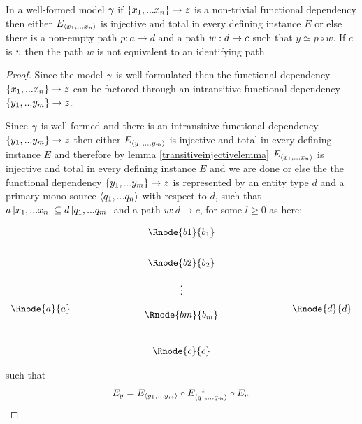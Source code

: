 \begin{lemma}
\label{mainlemma}
In a well-formed model $\gamma$ if $\{x_1,...x_n\} \rightarrow z$  is a non-trivial
functional dependency then either $E_{\langle x_1,...x_n\rangle}$ is injective and total in every defining instance $E$ 
or else there is a non-empty path $p:a \rightarrow d$
and a  path $w:d \rightarrow c$  such that $y \simeq p \circ w$. If $c$ is $v$ then
the path $w$ is not equivalent to an identifying path.
\end{lemma}
\begin{proof}
Since the model $\gamma$ is well-formulated then the functional dependency $\left\{x_1,...x_n\right\} \rightarrow z$ can be factored through an intransitive functional
dependency $\left\{y_1,...y_m\right\} \rightarrow z$. 

Since $\gamma$ is well formed  and there is an intransitive functional dependency $\left\{y_1,...y_m\right\} \rightarrow z$ then either $E_{\langle y_1,...y_m\rangle}$ is injective and total in every defining instance $E$ and therefore by lemma \ref{transitiveinjectivelemma} $E_{\langle x_1,...x_n\rangle}$ is injective and total in every defining instance $E$ and we are done or else the the functional dependency
$\left\{y_1,...y_m\right\} \rightarrow z$   is represented 
by  an entity type $d$ and 
a primary mono-source $\langle q_1,...q_n\rangle$ with respect to
$d$, such that $a\left[x_1,...x_n\right]\subseteq d\left[q_1,...q_m\right]$ and a 
path $w:d\rightarrow c$, for some $l \geq 0$ as here:

\setlength{\arraycolsep}{.2cm}
\begin{center}
$
\begin{array}{cp{2cm}c p{2cm} c}
             &  & \Rnode{b1}{b_1} & &               \\ [0.7cm]
						 &  & \Rnode{b2}{b_2} & &               \\ [0.4cm]
						 &  &     \vdots      & &               \\ [0.2cm]
\Rnode{a}{a} &  &                 & & \Rnode{d}{d}  \\ [-0.2cm]
             &  & \Rnode{bm}{b_m} & &               \\ [0.9cm]
             &  & \Rnode{c}{c}    & &               \\
\end{array}
$
\end{center}
such that
\begin{equation}
\label{fundependency}
E_y = E_{\langle y_1,...y_m\rangle} \circ E_{\langle q_1,...q_m\rangle}^{-1} \circ E_w
\end{equation}


\end{proof}
